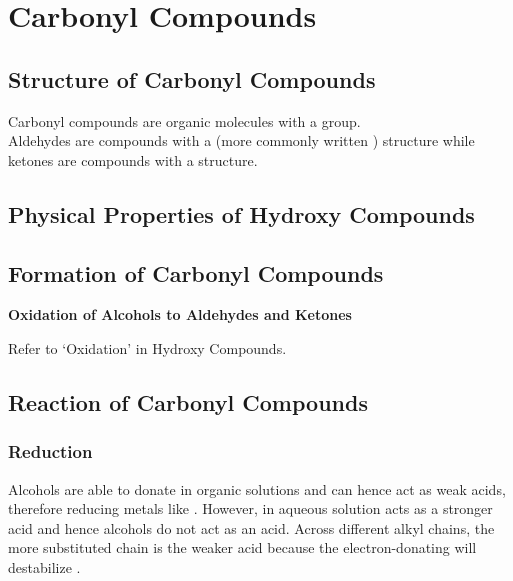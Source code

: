 \documentclass[../main]{subfiles}
\begin{document}
\section{Carbonyl Compounds}

	\subsection{Structure of Carbonyl Compounds}

	Carbonyl compounds are organic molecules with a  group. \\

	Aldehydes are compounds with a  (more commonly written ) structure while ketones are compounds with a  structure. \\

	\subsection{Physical Properties of Hydroxy Compounds}


	\subsection{Formation of Carbonyl Compounds}

	\noindent \textbf{Oxidation of Alcohols to Aldehydes and Ketones}

	Refer to `Oxidation' in Hydroxy Compounds. \\ 


	\subsection{Reaction of Carbonyl Compounds}

	\subsubsection{Reduction}

	Alcohols are able to donate  in organic solutions and can hence act as weak acids, therefore reducing metals like . However, in aqueous solution  acts as a stronger acid and hence alcohols do not act as an acid. Across different alkyl chains, the more substituted chain is the weaker acid because the electron-donating  will destabilize . \\
\end{document}
